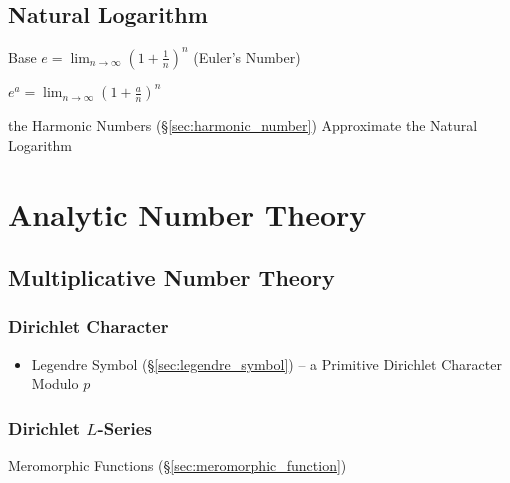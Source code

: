 \subsection{Natural Logarithm}\label{sec:natural_logarithm}

Base $e = \lim_{n \rightarrow \infty} (1 + \frac{1}{n})^n$
(Euler's Number)

$e^a = \lim_{n \rightarrow \infty} (1 + \frac{a}{n})^n$

the Harmonic Numbers (\S\ref{sec:harmonic_number}) Approximate the Natural
Logarithm



\section{Analytic Number Theory}\label{sec:analytic_number_theory}

\subsection{Multiplicative Number Theory}
\label{sec:multiplicative_number_theory}

\subsubsection{Dirichlet Character}\label{sec:dirichlet_character}

\begin{itemize}
  \item Legendre Symbol (\S\ref{sec:legendre_symbol}) -- a Primitive Dirichlet
    Character Modulo $p$
\end{itemize}



\subsubsection{Dirichlet $L$-Series}\label{sec:l_series}

Meromorphic Functions (\S\ref{sec:meromorphic_function})



